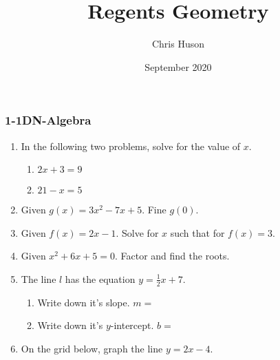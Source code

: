 \documentclass[12pt, twoside]{article}
\title{Regents Geometry}
\author{Chris Huson}
\date{September 2020}
\begin{document}
\subsubsection*{1-1DN-Algebra}
\begin{enumerate}
\item In the following two problems, solve for the value of $x$.
  \begin{multicols}{2}
    \begin{enumerate}
      \item   $2x+3=9$ \vspace{6cm}
      \item   $21-x=5$ \vspace{6cm}
    \end{enumerate}
  \end{multicols}
    \vspace{3cm}

\item Given $g(x)=3x^2-7x+5$. Fine $g(0)$. \vspace{4cm}
\item Given $f(x)=2x-1$. Solve for $x$ such that for $f(x)=3$. \vspace{5cm}
\item Given $x^2+6x+5=0$. Factor and find the roots. \vspace{4cm}
  
\newpage

\item The line $l$ has the equation $y=\frac{1}{2}x+7$. \vspace{0.5cm}
\begin{enumerate}
  \item Write down it's slope. $m=$
  \vspace{1cm}
  \item Write down it's $y$-intercept. $b=$
\end{enumerate}
\vspace{1cm}

\item On the grid below, graph the line $y=2x-4$.
  \vspace{0.5cm}

    \begin{center} %
    \end{center}

\end{enumerate}
\end{document}
